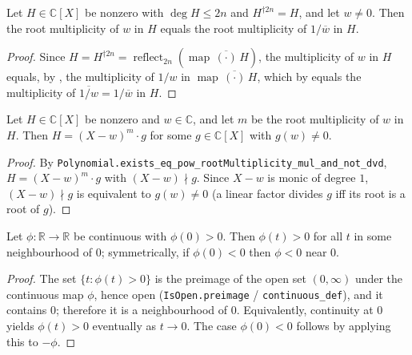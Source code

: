 \begin{lemma}
    \label{lem:conjrecip-root-pairing}
    \leanok
    Let $H \in \mathbb{C}[X]$ be nonzero with $\deg H \le 2n$ and
    $H^{\dagger 2n} = H$, and let $w \neq 0$. Then the root multiplicity of $w$
    in $H$ equals the root multiplicity of $1/\overline{w}$ in $H$.
\end{lemma}
\begin{proof}
    Since $H = H^{\dagger 2n} = \operatorname{reflect}_{2n}(\operatorname{map}\,
    \overline{(\cdot)}\,H)$, the multiplicity of $w$ in $H$ equals, by
    , the multiplicity of $1/w$ in
    $\operatorname{map}\,\overline{(\cdot)}\,H$, which by
     equals the multiplicity of
    $\overline{1/w} = 1/\overline{w}$ in $H$.
\end{proof}

\begin{lemma}
    \label{lem:local-factorization}
    \leanok
    Let $H \in \mathbb{C}[X]$ be nonzero and $w \in \mathbb{C}$, and let $m$ be
    the root multiplicity of $w$ in $H$. Then $H = (X - w)^{m}\cdot g$ for some
    $g \in \mathbb{C}[X]$ with $g(w) \neq 0$.
\end{lemma}
\begin{proof}
    By \texttt{Polynomial.exists\_eq\_pow\_rootMultiplicity\_mul\_and\_not\_dvd},
    $H = (X - w)^{m}\cdot g$ with $(X - w) \nmid g$. Since $X - w$ is monic of
    degree $1$, $(X - w) \nmid g$ is equivalent to $g(w) \neq 0$ (a linear
    factor divides $g$ iff its root is a root of $g$).
\end{proof}

\begin{lemma}
    \label{lem:sign-persistence}
    \leanok
    Let $\phi : \mathbb{R} \to \mathbb{R}$ be continuous with $\phi(0) > 0$.
    Then $\phi(t) > 0$ for all $t$ in some neighbourhood of $0$; symmetrically,
    if $\phi(0) < 0$ then $\phi < 0$ near $0$.
\end{lemma}
\begin{proof}
    The set $\{t : \phi(t) > 0\}$ is the preimage of the open set $(0,\infty)$
    under the continuous map $\phi$, hence open
    (\texttt{IsOpen.preimage} / \texttt{continuous\_def}), and it contains $0$;
    therefore it is a neighbourhood of $0$. Equivalently, continuity at $0$
    yields $\phi(t) > 0$ eventually as $t \to 0$. The case $\phi(0) < 0$ follows
    by applying this to $-\phi$.
\end{proof}

